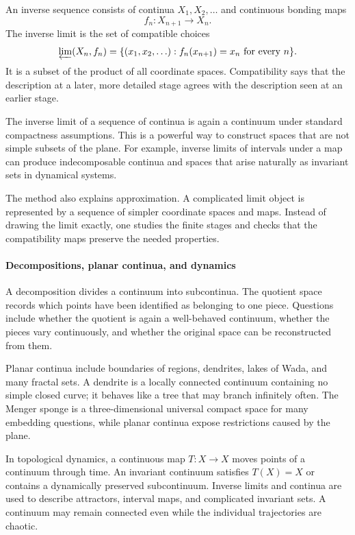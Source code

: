 An inverse sequence consists of continua $X_1,X_2,\ldots$ and continuous bonding maps
\[
 f_n:X_{n+1}\longrightarrow X_n.
\]
The inverse limit is the set of compatible choices
\[
 \varprojlim(X_n,f_n)
 =\{(x_1,x_2,\ldots):f_n(x_{n+1})=x_n\text{ for every }n\}.
\]
It is a subset of the product of all coordinate spaces. Compatibility says that the description at a later, more detailed stage agrees with the description seen at an earlier stage.

The inverse limit of a sequence of continua is again a continuum under standard compactness assumptions. This is a powerful way to construct spaces that are not simple subsets of the plane. For example, inverse limits of intervals under a map can produce indecomposable continua and spaces that arise naturally as invariant sets in dynamical systems.

The method also explains approximation. A complicated limit object is represented by a sequence of simpler coordinate spaces and maps. Instead of drawing the limit exactly, one studies the finite stages and checks that the compatibility maps preserve the needed properties. \cite{continuum_theory_ref1,continuum_theory_ref5}

\paragraph{Decompositions, planar continua, and dynamics}

A decomposition divides a continuum into subcontinua. The quotient space records which points have been identified as belonging to one piece. Questions include whether the quotient is again a well-behaved continuum, whether the pieces vary continuously, and whether the original space can be reconstructed from them.

Planar continua include boundaries of regions, dendrites, lakes of Wada, and many fractal sets. A dendrite is a locally connected continuum containing no simple closed curve; it behaves like a tree that may branch infinitely often. The Menger sponge is a three-dimensional universal compact space for many embedding questions, while planar continua expose restrictions caused by the plane.

In topological dynamics, a continuous map $T:X\to X$ moves points of a continuum through time. An invariant continuum satisfies $T(X)=X$ or contains a dynamically preserved subcontinuum. Inverse limits and continua are used to describe attractors, interval maps, and complicated invariant sets. A continuum may remain connected even while the individual trajectories are chaotic. \cite{continuum_theory_ref5,continuum_theory_ref6}

